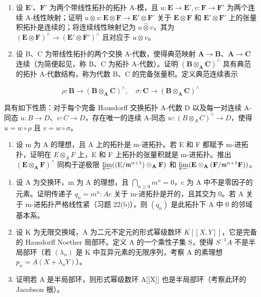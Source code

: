 \begin{enumerate}
\def\labelenumi{(\alph{enumi})}
\setcounter{enumi}{1}
\item
  设 \(\mathbf{E}'\)、\(\mathbf{F}'\) 为两个带线性拓扑的拓扑 A-模，且 \(u: \mathbf{E} \to \mathbf{E}', v: \mathbf{F} \to \mathbf{F}'\) 为两个连续 A-线性映射；证明 \(u \otimes v: \mathbf{E} \otimes \mathbf{F} \to \mathbf{E}' \otimes \mathbf{F}'\) 关于 \(\mathbf{E} \otimes \mathbf{F}\) 和 \(\mathbf{E}' \otimes \mathbf{F}'\) 上的张量积拓扑是连续的；将连续线性映射记为 \(u \hat{\otimes} v\)，其为 \((\mathbf{E} \otimes \mathbf{F})^{\wedge} \to (\mathbf{E}' \otimes \mathbf{F}')^{\wedge}\) 且对应于 \(u \otimes v\)。
\item
  设 B、C 为带线性拓扑的两个交换 A-代数，使得典范映射 \(\mathbf{A} \to \mathbf{B}\)、\(\mathbf{A} \to \mathbf{C}\) 连续（为简便起见，称 B、C 为拓扑 A-代数）。证明 \((\mathbf{B} \otimes_{\mathbf{A}} \mathbf{C})^{\wedge}\) 具有典范的拓扑 A-代数结构，称为代数 B、C 的完备张量积。定义典范连续表示
\end{enumerate}

\[
\rho \colon \mathbf {B} \rightarrow (\mathbf {B} \otimes_ {\mathbf {A}} \mathbf {C}) ^ {\wedge}, \quad \sigma \colon \mathbf {C} \rightarrow (\mathbf {B} \otimes_ {\mathbf {A}} \mathbf {C}) ^ {\wedge}
\]

具有如下性质：对于每个完备 Hausdorff 交换拓扑 A-代数 D 以及每一对连续 A-同态 \(u\colon B\to D\)、\(v\colon C\to D\)，存在唯一的连续 A-同态 \(w\colon(B\otimes_{A}C)^{\wedge}\to D\)，使得 \(u=w\circ\rho\) 且 \(v=w\circ\sigma\)。

\begin{enumerate}
\def\labelenumi{(\alph{enumi})}
\setcounter{enumi}{3}
\tightlist
\item
  设 m 为 A 的理想，且 A 上的拓扑是 m-进拓扑。若 E 和 F 都赋予 m-进拓扑，证明在 \(E \otimes_{A} F\) 上，E 和 F 上拓扑的张量积就是 m-进拓扑。推出 \((\mathbf{E} \otimes_{\mathbf{A}} \mathbf{F})^{\wedge}\) 同构于逆极限 \(\varprojlim ((\mathrm{E} / \mathfrak{m}^{n+1}) \otimes_{\mathbf{A}} \mathbf{F})\) 和 \(\varprojlim (\mathbf{E} \otimes_{\mathbf{A}} (\mathbf{F} / \mathfrak{m}^{n+1}\mathbf{F}))\)。
\end{enumerate}

\begin{enumerate}
\def\labelenumi{\arabic{enumi}.}
\setcounter{enumi}{28}
\item
  设 A 为交换环，m 为 A 的理想，且 \(\bigcap_{n\geq0}m^{n}=0\)，c 为 A 中不是零因子的元素。证明传递子 \(q_{n}=m^{n}:Ac\) 关于 m-进拓扑是开的，且其交为 0。若 A 关于 m-进拓扑严格线性紧（习题 22(b)），则 \((q_{n})\) 是此拓扑下 A 中 0 的邻域基本系。
\item
  设 K 为无限交换域，A 为二元不定元的形式幂级数环 \(K[[X,Y]]\)，它是完备的 Hausdorff Noether 局部环。定义 A 的一个乘性子集 S，使得 \(S^{-1}A\) 不是半局部环（若 \((\lambda_{n})\) 是 K 中互异元素的无限序列，考察 A 的素理想 \(p_{n}=A(X+\lambda_{n}Y)\)）。
\item
  证明若 A 是半局部环，则形式幂级数环 A{[}{[}X{]}{]} 也是半局部环（考察此环的 Jacobson 根）。
\end{enumerate}

